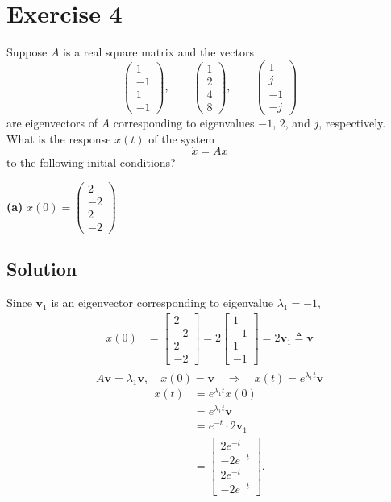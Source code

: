 \documentclass[12pt,a4paper]{article}
\begin{document}
\vspace{0.25cm}

\section*{Exercise 4}
Suppose $A$ is a real square matrix and the vectors
\[
\begin{pmatrix}1\\-1\\1\\-1\end{pmatrix},\qquad
\begin{pmatrix}1\\2\\4\\8\end{pmatrix},\qquad
\begin{pmatrix}1\\j\\-1\\-j\end{pmatrix}
\]
are eigenvectors of $A$ corresponding to eigenvalues $-1$, $2$, and $j$, respectively. What is the response $x(t)$ of the system
\[\dot{x}=Ax\]
to the following initial conditions?

\textbf{(a)} $x(0)=\begin{pmatrix}2\\-2\\2\\-2\end{pmatrix}$
\subsection*{Solution}

Since $\mathbf v_1$ is an eigenvector corresponding to eigenvalue $\lambda_1=-1$,
\begin{align*}
	x(0) &= \begin{bmatrix}2\\-2\\2\\-2\end{bmatrix}
	= 2\begin{bmatrix}1\\-1\\1\\-1\end{bmatrix}
	= 2\mathbf v_1 \triangleq \mathbf v \\
\end{align*}
\[
A\mathbf v = \lambda_1\mathbf v,\quad x(0)=\mathbf v\quad\Rightarrow\quad x(t)=e^{\lambda_1t}\mathbf v
\]
\begin{align*}
	x(t) &= e^{\lambda_1 t} x(0) \\
	 &= e^{\lambda_1 t} \mathbf v \\
		&= e^{-t} \cdot 2 \mathbf v_1 \\
		&= \begin{bmatrix}2e^{-t}\\-2e^{-t}\\2e^{-t}\\-2e^{-t}\end{bmatrix}.
\end{align*}
\end{document}
